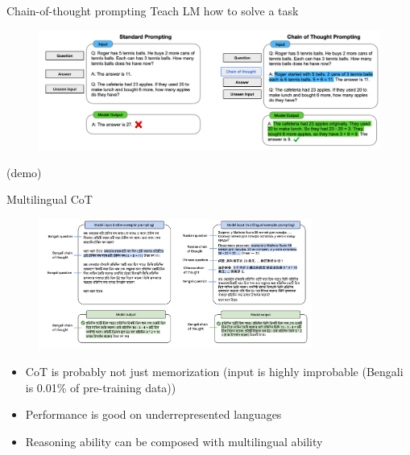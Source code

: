 \documentclass[usenames,dvipsnames,notes,11pt,aspectratio=169,hyperref={colorlinks=true, linkcolor=blue}]{beamer}
\newcommand{\pdfnote}[1]{}
\begin{document}
\begin{frame}
    {Chain-of-thought prompting}{}
    Teach LM how to solve a task    
    \begin{figure}
        \includegraphics[width=\textwidth]{figures/cot}
    \end{figure}

    (demo)
    \pdfnote{
        first letter of first and last name
    }
    \pdfnote{
        simpler CoT: e.g., A and W -> WA
    }
    \pdfnote{
        wrong CoT: e.g., first -> last 
    }
\end{frame}

\begin{frame}
    {Multilingual CoT}

    \begin{figure}
        \includegraphics[width=0.8\textwidth]{figures/multiling-cot}
    \end{figure}

    \begin{itemize}
        \item CoT is probably not just memorization (input is highly improbable (Bengali is 0.01\% of pre-training data))
        \item Performance is good on underrepresented languages
        \item Reasoning ability can be composed with multilingual ability
    \end{itemize}
\end{frame}
\end{document}
